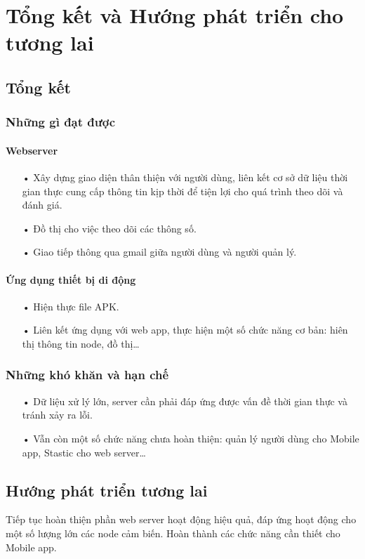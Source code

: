 \chapter{Tổng kết và Hướng phát triển cho tương lai}

\ifpdf
    \graphicspath{{Chapter5/Figs/Raster/}{Chapter5/Figs/PDF/}{Chapter5/Figs/}}
\else
    \graphicspath{{Chapter5/Figs/Vector/}{Chapter5/Figs/}}
\fi

\section{Tổng kết}
\subsection{Những gì đạt được}

\subsubsection*{Webserver}
\begin{itemize}
\item[•]Xây dựng giao diện thân thiện với người dùng, liên kết cơ sở dữ liệu thời gian thực cung cấp thông tin kịp thời để tiện lợi cho quá trình theo dõi và đánh giá.
\item[•]Đồ thị cho việc theo dõi các thông số.
\item[•]Giao tiếp thông qua gmail giữa người dùng và người quản lý.
\end{itemize}


\subsubsection*{Ứng dụng thiết bị di động}
\begin{itemize}
\item[•] Hiện thực file APK.
\item[•] Liên kết ứng dụng với web app, thực hiện một số chức năng cơ bản: hiên thị thông tin node, đồ thị…
\end{itemize}




\subsection{Những khó khăn và hạn chế}


\begin{itemize}
\item[•] Dữ liệu xử lý lớn, server cần phải đáp ứng được vấn đề thời gian thực và tránh xảy ra lỗi.
\item[•] Vẫn còn một số chức năng chưa hoàn thiện: quản lý người dùng cho Mobile app, Stastic cho web server…
\end{itemize}







\section{Hướng phát triển tương lai}
Tiếp tục hoàn thiện phần web server hoạt động hiệu quả, đáp ứng hoạt động cho một số lượng lớn các node cảm biến.
Hoàn thành các chức năng cần thiết cho Mobile app.
